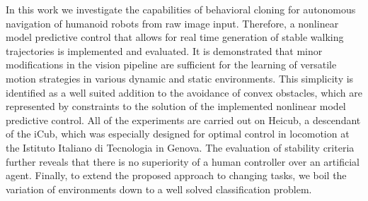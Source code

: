 In this work we investigate the capabilities of behavioral cloning for autonomous navigation of humanoid robots from raw image input. Therefore, a nonlinear model predictive control that allows for real time generation of stable walking trajectories is implemented and evaluated. It is demonstrated that minor modifications in the vision pipeline are sufficient for the learning of versatile motion strategies in various dynamic and static environments. This simplicity is identified as a well suited addition to the avoidance of convex obstacles, which are represented by constraints to the solution of the implemented nonlinear model predictive control. All of the experiments are carried out on Heicub, a descendant of the iCub, which was especially designed for optimal control in locomotion at the Istituto Italiano di Tecnologia in Genova. The evaluation of stability criteria further reveals that there is no superiority of a human controller over an artificial agent. Finally, to extend the proposed approach to changing tasks, we boil the variation of environments down to a well solved classification problem.
